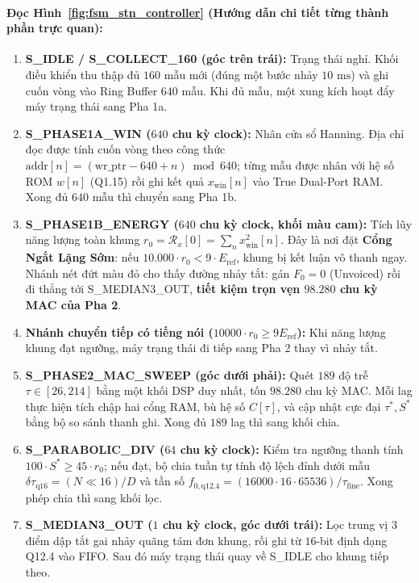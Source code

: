 \documentclass[11pt,a4paper]{article}
\begin{document}
\paragraph{Đọc Hình~\ref{fig:fsm_stn_controller} (Hướng dẫn chi tiết từng thành phần trực quan):}
\begin{enumerate}
    \setlength{\itemsep}{1.5pt}
    \item \textbf{S\_IDLE / S\_COLLECT\_160 (góc trên trái):} Trạng thái nghỉ. Khối điều khiển thu thập đủ $160$ mẫu mới (đúng một bước nhảy $10\text{ ms}$) và ghi cuốn vòng vào Ring Buffer $640$ mẫu. Khi đủ mẫu, một xung kích hoạt đẩy máy trạng thái sang Pha 1a.
    \item \textbf{S\_PHASE1A\_WIN ($640$ chu kỳ clock):} Nhân cửa sổ Hanning. Địa chỉ đọc được tính cuốn vòng theo công thức $\text{addr}[n] = (\text{wr\_ptr} - 640 + n) \bmod 640$; từng mẫu được nhân với hệ số ROM $w[n]$ (Q1.15) rồi ghi kết quả $x_{\text{win}}[n]$ vào True Dual-Port RAM. Xong đủ $640$ mẫu thì chuyển sang Pha 1b.
    \item \textbf{S\_PHASE1B\_ENERGY ($640$ chu kỳ clock, khối màu cam):} Tích lũy năng lượng toàn khung $r_0 = \mathcal{R}_x[0] = \sum_n x_{\text{win}}^2[n]$. Đây là nơi đặt \textbf{Cổng Ngắt Lặng Sớm}: nếu $10.000 \cdot r_0 < 9 \cdot E_{\text{ref}}$, khung bị kết luận vô thanh ngay. Nhánh nét đứt màu đỏ cho thấy đường nhảy tắt: gán $F_0 = 0$ (Unvoiced) rồi đi thẳng tới S\_MEDIAN3\_OUT, \textbf{tiết kiệm trọn vẹn $98.280$ chu kỳ MAC của Pha 2}.
    \item \textbf{Nhánh chuyển tiếp có tiếng nói ($10000 \cdot r_0 \ge 9 E_{\text{ref}}$):} Khi năng lượng khung đạt ngưỡng, máy trạng thái đi tiếp sang Pha 2 thay vì nhảy tắt.
    \item \textbf{S\_PHASE2\_MAC\_SWEEP (góc dưới phải):} Quét $189$ độ trễ $\tau \in [26, 214]$ bằng một khối DSP duy nhất, tốn $98.280$ chu kỳ MAC. Mỗi lag thực hiện tích chập hai cổng RAM, bù hệ số $C[\tau]$, và cập nhật cực đại $\tau^*, S^*$ bằng bộ so sánh thanh ghi. Xong đủ $189$ lag thì sang khối chia.
    \item \textbf{S\_PARABOLIC\_DIV ($64$ chu kỳ clock):} Kiểm tra ngưỡng thanh tính $100 \cdot S^* \ge 45 \cdot r_0$; nếu đạt, bộ chia tuần tự tính độ lệch đỉnh dưới mẫu $\delta\tau_{\text{q16}} = (N \ll 16) / D$ và tần số $f_{0,\text{q12.4}} = (16000 \cdot 16 \cdot 65536) / \tau_{\text{fine}}$. Xong phép chia thì sang khối lọc.
    \item \textbf{S\_MEDIAN3\_OUT ($1$ chu kỳ clock, góc dưới trái):} Lọc trung vị $3$ điểm dập tắt gai nhảy quãng tám đơn khung, rồi ghi từ $16$-bit định dạng Q12.4 vào FIFO. Sau đó máy trạng thái quay về S\_IDLE cho khung tiếp theo.
\end{enumerate}
\end{document}
